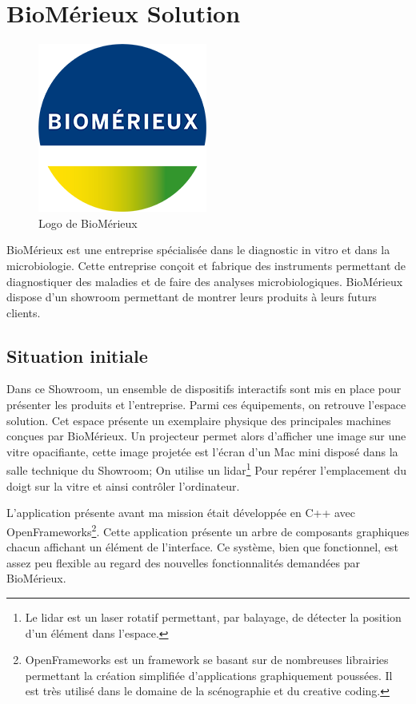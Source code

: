 \section{BioMérieux Solution}

\begin{figure}[h]
    \centering
    \includegraphics[scale=0.5]{img/bmx.png}
    \caption{Logo de BioMérieux}
\end{figure}

BioMérieux est une entreprise spécialisée dans le diagnostic in vitro et dans la microbiologie.
Cette entreprise conçoit et fabrique des instruments permettant de diagnostiquer des maladies et de faire des analyses microbiologiques.
BioMérieux dispose d'un showroom permettant de montrer leurs produits à leurs futurs clients.

\subsection{Situation initiale}

Dans ce Showroom, un ensemble de dispositifs interactifs sont mis en place pour présenter les produits et l'entreprise.
Parmi ces équipements, on retrouve l'espace solution.
Cet espace présente un exemplaire physique des principales machines conçues par BioMérieux.
Un projecteur permet alors d'afficher une image sur une vitre opacifiante, cette image projetée est l'écran d'un Mac mini disposé dans la salle technique du Showroom;
On utilise un lidar\footnote{Le lidar est un laser rotatif permettant, par balayage, de détecter la position d'un élément dans l'espace.} Pour repérer l'emplacement du doigt sur la vitre et ainsi contrôler l'ordinateur.

L'application présente avant ma mission était développée en C++ avec OpenFrameworks\footnote{OpenFrameworks est un framework se basant sur de nombreuses librairies permettant la création simplifiée d'applications graphiquement poussées. Il est très utilisé dans le domaine de la scénographie et du creative coding.}.
Cette application présente un arbre de composants graphiques chacun affichant un élément de l'interface.
Ce système, bien que fonctionnel, est assez peu flexible au regard des nouvelles fonctionnalités demandées par BioMérieux.

